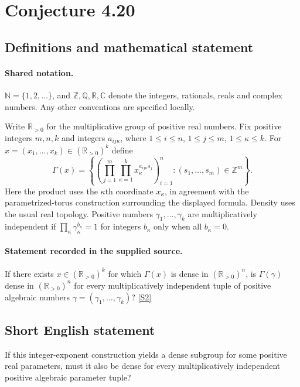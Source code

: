 \documentclass[11pt]{article}
\newcommand{\sref}[2]{\hyperlink{source:#1:#2}{[S#2]}}
\begin{document}
\section{Conjecture 4.20}\label{statement}

\subsection{Definitions and mathematical statement}

\paragraph{Shared notation.}$\mathbb N=\{1,2,\ldots\}$, and $\mathbb Z,\mathbb Q,\mathbb R,\mathbb C$ denote the integers, rationals, reals and complex numbers. Any other conventions are specified locally.


Write $\mathbb R_{>0}$ for the multiplicative group of positive real numbers. Fix positive integers $m,n,k$ and integers $a_{ij\kappa}$, where $1\le i\le n$, $1\le j\le m$, $1\le\kappa\le k$. For $x=(x_1,\ldots,x_k)\in(\mathbb R_{>0})^k$ define
\[
\Gamma(x)=\left\{\left(\prod_{j=1}^m\prod_{\kappa=1}^k x_\kappa^{a_{ij\kappa}s_j}\right)_{i=1}^n:(s_1,\ldots,s_m)\in\mathbb Z^m\right\}.
\]
Here the product uses the $\kappa$th coordinate $x_\kappa$, in agreement with the parametrized-torus construction surrounding the displayed formula. Density uses the usual real topology. Positive numbers $\gamma_1,\ldots,\gamma_k$ are multiplicatively independent if $\prod_\kappa\gamma_\kappa^{b_\kappa}=1$ for integers $b_\kappa$ only when all $b_\kappa=0$.
\paragraph{Statement recorded in the supplied source.}
If there exists $x\in(\mathbb R_{>0})^k$ for which $\Gamma(x)$ is dense in $(\mathbb R_{>0})^n$, is $\Gamma(\gamma)$ dense in $(\mathbb R_{>0})^n$ for every multiplicatively independent tuple of positive algebraic numbers $\gamma=(\gamma_1,\ldots,\gamma_k)$? \sref{statement}{2}

\subsection{Short English statement}
If this integer-exponent construction yields a dense subgroup for some positive real parameters, must it also be dense for every multiplicatively independent positive algebraic parameter tuple?
\end{document}
